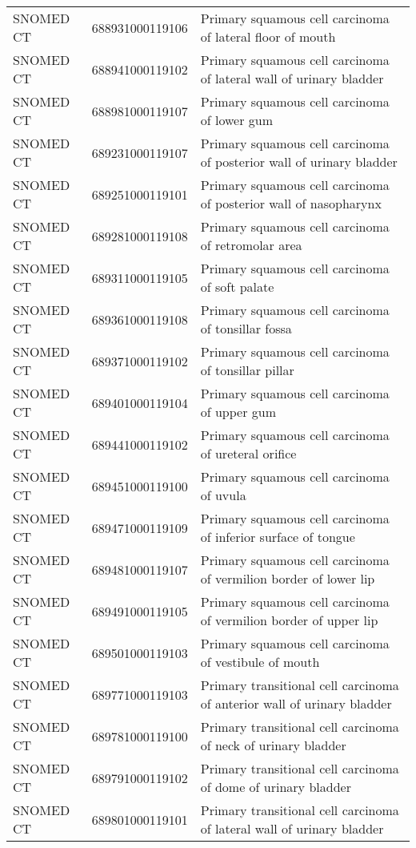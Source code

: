 \begin{longtable}{p{}p{}p{}}
  SNOMED CT & 688931000119106 & Primary squamous cell carcinoma of lateral floor of mouth \\ 
  SNOMED CT & 688941000119102 & Primary squamous cell carcinoma of lateral wall of urinary bladder \\ 
  SNOMED CT & 688981000119107 & Primary squamous cell carcinoma of lower gum \\ 
  SNOMED CT & 689231000119107 & Primary squamous cell carcinoma of posterior wall of urinary bladder \\ 
  SNOMED CT & 689251000119101 & Primary squamous cell carcinoma of posterior wall of nasopharynx \\ 
  SNOMED CT & 689281000119108 & Primary squamous cell carcinoma of retromolar area \\ 
  SNOMED CT & 689311000119105 & Primary squamous cell carcinoma of soft palate \\ 
  SNOMED CT & 689361000119108 & Primary squamous cell carcinoma of tonsillar fossa \\ 
  SNOMED CT & 689371000119102 & Primary squamous cell carcinoma of tonsillar pillar \\ 
  SNOMED CT & 689401000119104 & Primary squamous cell carcinoma of upper gum \\ 
  SNOMED CT & 689441000119102 & Primary squamous cell carcinoma of ureteral orifice \\ 
  SNOMED CT & 689451000119100 & Primary squamous cell carcinoma of uvula \\ 
  SNOMED CT & 689471000119109 & Primary squamous cell carcinoma of inferior surface of tongue \\ 
  SNOMED CT & 689481000119107 & Primary squamous cell carcinoma of vermilion border of lower lip \\ 
  SNOMED CT & 689491000119105 & Primary squamous cell carcinoma of vermilion border of upper lip \\ 
  SNOMED CT & 689501000119103 & Primary squamous cell carcinoma of vestibule of mouth \\ 
  SNOMED CT & 689771000119103 & Primary transitional cell carcinoma of anterior wall of urinary bladder \\ 
  SNOMED CT & 689781000119100 & Primary transitional cell carcinoma of neck of urinary bladder \\ 
  SNOMED CT & 689791000119102 & Primary transitional cell carcinoma of dome of urinary bladder \\ 
  SNOMED CT & 689801000119101 & Primary transitional cell carcinoma of lateral wall of urinary bladder \\ 

\end{longtable}
